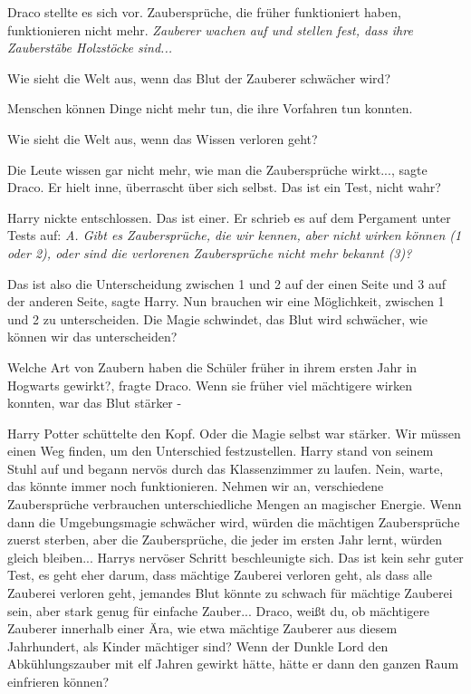 Draco stellte es sich vor. \glqq Zaubersprüche, die früher funktioniert haben,
funktionieren nicht mehr.\grqq{} \emph{Zauberer wachen auf und stellen fest,
dass ihre Zauberstäbe Holzstöcke sind... }

\glqq Wie sieht die Welt aus, wenn das Blut der Zauberer schwächer wird?\grqq{}

\glqq Menschen können Dinge nicht mehr tun, die ihre Vorfahren tun
konnten.\grqq{}

\glqq Wie sieht die Welt aus, wenn das Wissen verloren geht?\grqq{}

\glqq Die Leute wissen gar nicht mehr, wie man die Zaubersprüche
wirkt...\grqq{}, sagte Draco. Er hielt inne, überrascht über sich selbst. \glqq
Das ist ein Test, nicht wahr?\grqq{}

Harry nickte entschlossen. \glqq Das ist einer.\grqq{} Er schrieb es auf dem
Pergament unter Tests auf: \emph{A. Gibt es Zaubersprüche, die wir kennen, aber
nicht wirken können (1 oder 2), oder sind die verlorenen Zaubersprüche nicht
mehr bekannt (3)? }

\glqq Das ist also die Unterscheidung zwischen 1 und 2 auf der einen Seite und 3
auf der anderen Seite\grqq{}, sagte Harry. \glqq Nun brauchen wir eine
Möglichkeit, zwischen 1 und 2 zu unterscheiden. Die Magie schwindet, das Blut
wird schwächer, wie können wir das unterscheiden?\grqq{}

\glqq Welche Art von Zaubern haben die Schüler früher in ihrem ersten Jahr in
Hogwarts gewirkt?\grqq{}, fragte Draco. \glqq Wenn sie früher viel mächtigere
wirken konnten, war das Blut stärker -\grqq{}

Harry Potter schüttelte den Kopf. \glqq Oder die Magie selbst war stärker. Wir
müssen einen Weg finden, um den Unterschied festzustellen.\grqq{} Harry stand
von seinem Stuhl auf und begann nervös durch das Klassenzimmer zu laufen. \glqq
Nein, warte, das könnte immer noch funktionieren. Nehmen wir an, verschiedene
Zaubersprüche verbrauchen unterschiedliche Mengen an magischer Energie. Wenn
dann die Umgebungsmagie schwächer wird, würden die mächtigen Zaubersprüche
zuerst sterben, aber die Zaubersprüche, die jeder im ersten Jahr lernt, würden
gleich bleiben...\grqq{} Harrys nervöser Schritt beschleunigte sich. \glqq Das
ist kein sehr guter Test, es geht eher darum, dass mächtige Zauberei verloren
geht, als dass alle Zauberei verloren geht, jemandes Blut könnte zu schwach für
mächtige Zauberei sein, aber stark genug für einfache Zauber... Draco, weißt du,
ob mächtigere Zauberer innerhalb einer Ära, wie etwa mächtige Zauberer aus
diesem Jahrhundert, als Kinder mächtiger sind? Wenn der Dunkle Lord den
Abkühlungszauber mit elf Jahren gewirkt hätte, hätte er dann den ganzen Raum
einfrieren können?\grqq{}

